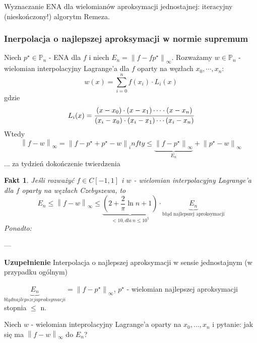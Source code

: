 \documentclass[hidelinks,a4paper,fleqn,oneside]{book}
\newcommand{\norm}[1]{\left\lVert#1\right\rVert}
\newtheorem{fakt}{Fakt}
\begin{document}
Wyznaczanie ENA dla wielomianów aproksymacji jednostajnej: iteracyjny (nieskończony!) algorytm Remeza.

\subsubsection{Inerpolacja o najlepszej aproksymacji w normie supremum}

Niech $p^\star \in \mathbb{P}_n$ - ENA dla $f$ i niech $E_n = \norm{f-f p^\star}_\infty$. Rozważamy $w \in \mathbb{P}_n$ - wielomian interpolacyjny Lagrange'a dla $f$ oparty na węzłach $x_0, \cdots, x_n$:
\[
	w(x) = \sum_{i=0}^n f(x_i) \cdot L_i(x)
\]
gdzie
\[
	L_i(x) = \cfrac{(x-x_0)\cdot(x-x_1)\cdots\cdot(x-x_n)}{(x_i-x_0)\cdot(x_i - x_1)\cdots(x_i-x_n)}
\]
Wtedy
\[
	\norm{f-w}_\infty = \norm{f-p^\star + p^\star - w}_infty \leq \underbrace{\norm{f-p^\star}_\infty}_{E_n} + \norm{p^\star - w}_\infty
\]
... za tydzień dokończenie twierdzenia

\begin{fakt}
	Jeśli rozważyć $f \in C[-1, 1]$ i $w$ - wielomian interpolacyjny Lagrange'a dla $f$ oparty na węzłach Czebyszewa, to 
	\[
		E_n \leq \norm{f-w}_\infty \leq \underbrace{(2+\frac{2}{\pi}\ln{n+1})}_{<10, dla\ n \leq 10^5}\cdot \underbrace{E_n}_{\textrm{błąd najlepszej aproksymacji}}
	\]
	Ponadto:
	\[
	\]
\end{fakt}

---

\textbf{Uzupełnienie} Interpolacja o najlepszej aproksymacji w sensie jednostajnym (w przypadku ogólnym)

$\underbrace{E_n}_{błąd najlepszej aproksymacji} = \norm{f-p^\star}_\infty$, $p^\star$ - wielomian najlepszej aproksymacji stopnia $\leq$ n.

Niech $w$ - wielomian inteprolacyjny Lagrange'a oparty na $x_0, ..., x_n$ i pytanie: jak się ma $\norm{f-w}_\infty$ do $E_n$?
\end{document}
